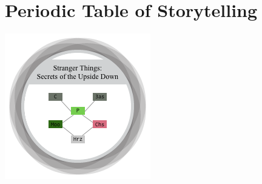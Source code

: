 
\section{Periodic Table of Storytelling }


\begin{center}
	\includegraphics[width=0.75\linewidth]{images/story_molecolar.png}
\end{center}

\vspace*{2mm}

